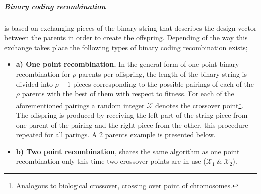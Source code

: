\subparagraph{Binary coding recombination} is based on exchanging pieces of the binary string that describes the design vector between the parents in order to create the offspring. Depending of the way this exchange takes place the following types of binary coding recombination exists;
\begin{itemize}
\item[]{\bf a) One point recombination.} 
In the general form of one point binary recombination for $\rho$ parents per offspring, the length of the binary string is divided into $\rho-1$ pieces corresponding to the possible pairings of each of the $\rho$ parents with the best of them with respect to fitness. For each of the aforementioned pairings a random integer $\mathcal{X}$ denotes the crossover point\footnote{Analogous to biological crossover, crossing over point of chromosomes.}. The offspring is produced by receiving the left part of the string piece from one parent of the pairing and the right piece from the other, this procedure repeated for all parings. A 2 parents example is presented below.
\begin{figure}[h!]
\begin{minipage}[b]{1.0\linewidth}
 \centering
\end{minipage}
\label{onepX}
\end{figure}
\pagebreak    
\item[]{\bf b) Two point recombination}, shares the same algorithm as one point recombination only this time two crossover points are in use ($\mathcal{X}_1~\&~\mathcal{X}_2$).

\begin{figure}[h!]
\begin{minipage}[b]{1.0\linewidth}
 \centering
\end{minipage}
\label{onepX}
\end{figure}


\end{itemize}
